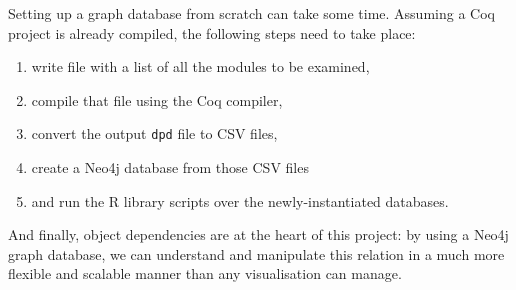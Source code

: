 Setting up a graph database from scratch can take some time. Assuming a Coq project
is already compiled, the following steps need to take place:

\begin{enumerate}
  \item write file with a list of all the modules to be examined,
  \item compile that file using the Coq compiler,
  \item convert the output \texttt{dpd} file to CSV files,
  \item create a Neo4j database from those CSV files
  \item and run the R library scripts over the newly-instantiated databases.
\end{enumerate}

And finally, object dependencies are at the heart of this project: by using a
Neo4j graph database, we can understand and manipulate this relation in a much
more flexible and scalable manner than any visualisation can manage.

